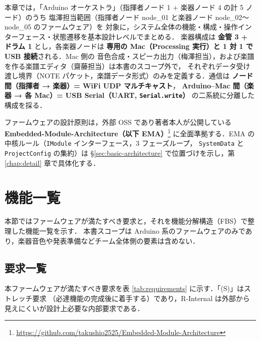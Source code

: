 \documentclass[lualatex,book,paper=a4paper,jafontsize=11.5pt,jafontscale=1.05]{jlreq}
\begin{document}


本章では，「Arduino オーケストラ」（指揮者ノード 1 + 楽器ノード 4 の計 5 ノード）のうち
塩澤担当範囲（指揮者ノード node\_01 と楽器ノード node\_02〜node\_05 のファームウェア）を
対象に，システム全体の機能・構成・操作インターフェース・状態遷移を基本設計レベルでまとめる．
楽器構成は \textbf{金管 3 + ドラム 1} とし，各楽器ノードは
\textbf{専用の Mac（Processing 実行）と 1 対 1 で USB 接続}される．Mac 側の
音色合成・スピーカ出力（梅澤担当），および楽譜を作る楽譜エディタ（齋藤担当）は本書のスコープ外で，
それぞれデータ受け渡し境界（NOTE パケット，楽譜データ形式）のみを定義する．通信は \textbf{ノード間（指揮者 → 楽器）= WiFi UDP マルチキャスト}，
\textbf{Arduino--Mac 間（楽器 → 各 Mac）= USB Serial（UART, \texttt{Serial.write}）}
の二系統に分離した構成を採る．

ファームウェアの設計原則は，外部 OSS であり著者本人が公開している
\textbf{Embedded-Module-Architecture（以下 EMA）}\footnote{\url{https://github.com/takushio2525/Embedded-Module-Architecture}}
に全面準拠する．EMA の中核ルール（\texttt{IModule} インターフェース，3 フェーズループ，
\texttt{SystemData} と \texttt{ProjectConfig} の集約）は \S\ref{sec:basic-architecture}
で位置づけを示し，第 \ref{chap:detail} 章で具体化する．


\section{機能一覧}\label{sec:basic-functions}

本節ではファームウェアが満たすべき要求と，それを機能分解構造（FBS）で整理した機能一覧を示す．
本書スコープは Arduino 系のファームウェアのみであり，楽器音色や発表準備などチーム全体側の要素は含めない．

\subsection{要求一覧}

本ファームウェアが満たすべき要求を表 \ref{tab:requirements} に示す．「(S)」はストレッチ要求
（必達機能の完成後に着手する）であり，R-Internal は外部から見えにくいが設計上必要な内部要求である．
\end{document}
